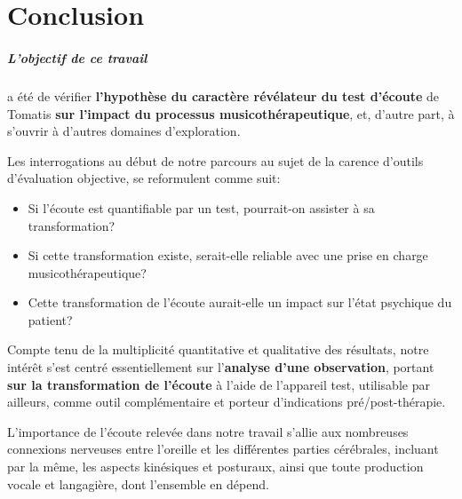
\chapter{Conclusion}
\label{Conclusions}


\paragraph{L'objectif de ce travail} a été de vérifier\textbf{ l'hypothèse du caractère
révélateur du test
d'écoute }de Tomatis \textbf{ sur l'impact du processus musicothérapeutique},
et, d'autre part, à s'ouvrir à d'autres
domaines d'exploration.

Les interrogations au début de notre parcours au
sujet de la carence d'outils d'évaluation objective, se 
reformulent comme suit:
\begin{itemize}
     \item 
       Si l'écoute est quantifiable  par un test, pourrait-on assister à sa
transformation?
\item Si cette transformation existe, serait-elle reliable avec
une prise en charge musicothérapeutique?
\item Cette transformation de l'écoute aurait-elle un impact sur l'état
psychique du patient? %
\end{itemize}



  Compte tenu de la multiplicité quantitative et qualitative des
  résultats, notre intérêt s'est centré essentiellement sur l'\textbf{analyse d'une
  observation}, portant \textbf{sur la transformation de l'écoute} à l'aide de
  l'appareil test, utilisable par ailleurs, comme outil complémentaire
  et porteur d'indications pré/post-thérapie.
 

  
 
L'importance de l'écoute relevée dans notre travail
s'allie aux nombreuses connexions nerveuses entre l'oreille et les
différentes parties cérébrales, incluant par la même, les aspects kinésiques
et posturaux, ainsi que toute production vocale et langagière,
dont l'ensemble en dépend.



